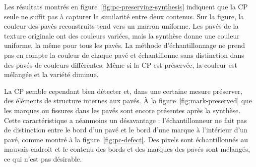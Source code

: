 \bigskip

Les résultats montrés en figure~\ref{fig:pc-preserving-synthesis} indiquent que la CP seule ne suffit pas à capturer la similarité entre deux contenus. Sur la figure, la couleur des pavés reconstruits tend vers un marron uniforme. Les pavés de la texture originale ont des couleurs variées, mais la synthèse donne une couleur uniforme, la même pour tous les pavés. La méthode d'échantillonnage ne prend pas en compte la couleur de chaque pavé et échantillonne sans distinction dans des pavés de couleurs différentes. Même si la CP est préservée, la couleur est mélangée et la variété diminue.

\bigskip

La CP semble cependant bien détecter et, dans une certaine mesure préserver, des éléments de structure internes aux pavés. À la figure~\ref{fig:mark-preserved} que les marques ou fissures dans les pavés sont encore présentes après la synthèse. Cette caractéristique a néanmoins un désavantage : l'échantillonneur ne fait pas de distinction entre le bord d'un pavé et le bord d'une marque à l'intérieur d'un pavé, comme montré à la figure~\ref{fig:pc-defect}. Des pixels sont échantillonnés au mauvais endroit et le contenu des bords et des marques des pavés sont mélangés, ce qui n'est pas désirable.

\bigskip

